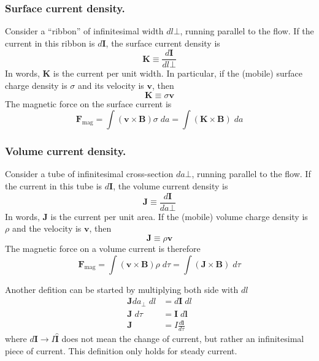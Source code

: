 \documentclass[../../../main.tex]{subfiles}
\begin{document}
\subsubsection{Surface current density.} Consider a “ribbon” of infinitesimal width $dl\bot$, running parallel to the ﬂow. If the current in this ribbon is $d\mathbf{I}$, the surface current density is
\begin{equation*}
    \mathbf{K}\equiv\frac{d\mathbf{I}}{dl\bot}
\end{equation*}
In words, $\mathbf{K}$ is the current per unit width. In particular, if the (mobile) surface charge density is $\sigma$ and its velocity is $\mathbf{v}$, then
\begin{equation*}
    \mathbf{K}\equiv\sigma\mathbf{v}
\end{equation*}
The magnetic force on the surface current is
\begin{equation*}
    \mathbf{F}_{\text{mag}}=\int (\mathbf{v}\times\mathbf{B})\sigma\;da= \int (\mathbf{K}\times\mathbf{B})\;da
\end{equation*}

\subsubsection{Volume current density.} Consider a tube of infinitesimal cross-section $da\bot$, running parallel to the ﬂow. If the current in this tube is $d\mathbf{I}$, the volume current density is
\begin{equation*}
    \mathbf{J}\equiv\frac{d\mathbf{I}}{da\bot}
\end{equation*}
In words, $\mathbf{J}$ is the current per unit area. If the (mobile) volume charge density is $\rho$ and the velocity is $\mathbf{v}$, then
\begin{equation*}
    \mathbf{J}\equiv\rho\mathbf{v}
\end{equation*}
The magnetic force on a volume current is therefore
\begin{equation*}
    \mathbf{F}_{\text{mag}}=\int (\mathbf{v}\times\mathbf{B})\rho\;d\tau= \int (\mathbf{J}\times\mathbf{B})\;d\tau
\end{equation*}

Another defition can be started by multiplying both side with $dl$
\begin{equation*}
\end{equation*}
\begin{align*}
    \mathbf{J} d a_\perp \;d l & =  d \mathbf{I}\; d l         \\
    \mathbf{J}\;d\tau          & = \mathbf{I}\;d \mathbf{l}\\
    \mathbf{J}&= I \frac{d \mathbf{l}}{d\tau}
\end{align*}
where $d\mathbf{I} \rightarrow I \mathbf{\hat{I}}$ does not mean the change of current, but rather an infinitesimal piece of current.
This definition only holds for steady current.
\end{document}
